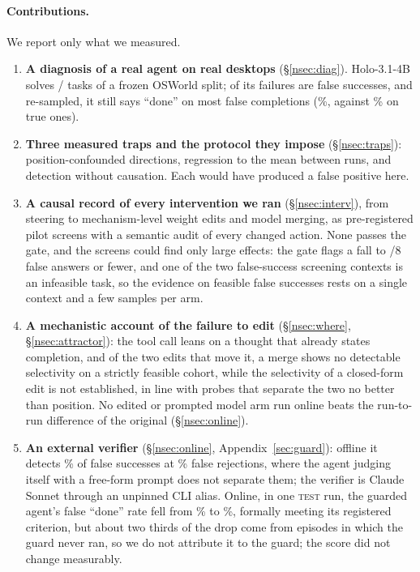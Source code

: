 \paragraph{Contributions.} We report only what we measured.
\begin{enumerate}
\item \textbf{A diagnosis of a real agent on real desktops} (\S\ref{nsec:diag}). Holo-3.1-4B solves \oswNSuccess/\oswNScored{} tasks of a frozen OSWorld split; \oswCatFalseSuccess{} of its \oswNFail{} failures are false successes, and re-sampled, it still says ``done'' on most false completions (\pwOrigFspPct\%, against \pwOrigFsmPct\% on true ones).
\item \textbf{Three measured traps and the protocol they impose} (\S\ref{nsec:traps}): position-confounded directions, regression to the mean between runs, and detection without causation. Each would have produced a false positive here.
\item \textbf{A causal record of every intervention we ran} (\S\ref{nsec:interv}), from steering to mechanism-level weight edits and model merging, as pre-registered pilot screens with a semantic audit of every changed action. None passes the gate, and the screens could find only large effects: the gate flags a fall to \gateMaxAnswers/8 false answers or fewer, and one of the two false-success screening contexts is an infeasible task, so the evidence on feasible false successes rests on a single context and a few samples per arm.
\item \textbf{A mechanistic account of the failure to edit} (\S\ref{nsec:where}, \S\ref{nsec:attractor}): the tool call leans on a thought that already states completion, and of the two edits that move it, a merge shows no detectable selectivity on a strictly feasible cohort, while the selectivity of a closed-form edit is not established, in line with probes that separate the two no better than position. No edited or prompted model arm run online beats the run-to-run difference of the original (\S\ref{nsec:online}).
\item \textbf{An external verifier} (\S\ref{nsec:online}, Appendix~\ref{sec:guard}): offline it detects \gbClaudeDet\% of false successes at \gbClaudeRej\% false rejections, where the agent judging itself with a free-form prompt does not separate them; the verifier is Claude Sonnet through an unpinned CLI alias. Online, in one \textsc{test} run, the guarded agent's false ``done'' rate fell from \OgFdBase\% to \OgFdGuard\%, formally meeting its registered criterion, but about two thirds of the drop come from episodes in which the guard never ran, so we do not attribute it to the guard; the score did not change measurably.
\end{enumerate}


